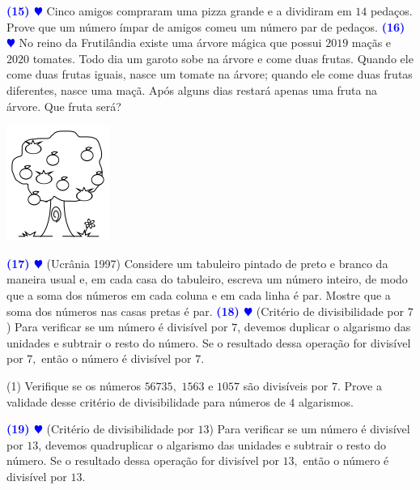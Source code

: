 \documentclass[12pt, a4paper]{article}
\newcommand{\negrito}[1]{\mbox{\boldmath{$#1$}}}
\begin{document}
\textcolor{blue}{\bf(15) $\varheart$} Cinco amigos compraram uma pizza grande e a dividiram em $14$ pedaços. Prove que um número ímpar de amigos comeu um número par de pedaços.
\newline\newline
\textcolor{blue}{\bf(16) $\varheart$} No reino da Frutilândia existe uma árvore mágica que possui $2019$ maçãs e $2020$ tomates. Todo dia um garoto sobe na árvore e come duas frutas. Quando ele come duas frutas iguais, nasce um tomate na árvore; quando ele come duas frutas diferentes, nasce uma maçã. Após alguns dias restará apenas uma fruta na árvore. Que fruta será?
\begin{center}
\includegraphics[scale=1]{Listas do PIC/frutilandia.png}
\end{center}
\textcolor{blue}{\bf(17) $\varheart$} (Ucrânia 1997) Considere um tabuleiro pintado de preto e branco da maneira usual e, em cada casa do tabuleiro, escreva um número inteiro, de modo que a soma
dos números em cada coluna e em cada linha é par. Mostre que a soma dos números nas casas pretas é par.
\newline\newline
\textcolor{blue}{\bf(18) $\varheart$} (Critério de divisibilidade por $7$) Para verificar se um número é divisível por $7$, devemos duplicar o algarismo das unidades e subtrair o resto do número. Se o resultado dessa operação for divisível por $7,$ então o número é divisível por $7.$
\begin{tasks}[counter-format={(tsk[a])},label-width=3.6ex, label-format = {\bfseries}, column-sep = {0pt}](1)
\task[\textcolor{Floresta}{$\negrito{(a)} $}] Verifique se os números $56735,$ $1563$ e $1057$ são divisíveis por $7$.
\task[\textcolor{Floresta}{$\negrito{(b)} $}] Prove a validade desse critério de divisibilidade para números de $4$ algarismos.
\end{tasks}
\textcolor{blue}{\bf(19) $\varheart$} (Critério de divisibilidade por $13$) Para verificar se um número é divisível por $13$, devemos quadruplicar o algarismo das unidades e subtrair o resto do número. Se o resultado dessa operação for divisível por $13,$ então o número é divisível por $13.$
\end{document}
